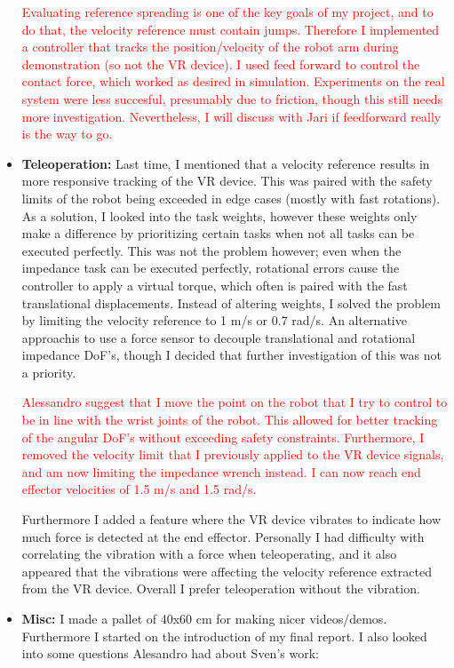 \documentclass[11pt]{report}
\numberwithin{equation}{section}        %
\numberwithin{figure}{section}          %
\numberwithin{table}{section}           %
\begin{document}
\begin{itemize}
   \textcolor{red}{Evaluating reference spreading is one of the key goals of my project, and to do that, the velocity reference must contain jumps. Therefore I implemented a controller that tracks the position/velocity of the robot arm during demonstration (so not the VR device). I used feed forward to control the contact force, which worked as desired in simulation. Experiments on the real system were less succesful, presumably due to friction, though this still needs more investigation. Nevertheless, I will discuss with Jari if feedforward really is the way to go.  }

  \item \textbf{Teleoperation:} Last time, I mentioned that a velocity reference results in more responsive tracking of the VR device. This was paired with the safety limits of the robot being exceeded in edge cases (mostly with fast rotations). As a solution, I looked into the task weights, however these weights only make a difference by prioritizing certain tasks when not all tasks can be executed perfectly. This was not the problem however; even when the impedance task can be executed perfectly, rotational errors cause the controller to apply a virtual torque, which often is paired with the fast translational displacements. Instead of altering weights, I solved the problem by limiting the velocity reference to 1 m/s or 0.7 rad/s. An alternative approachis to use a force sensor to decouple translational and rotational impedance DoF's, though I decided that further investigation of this was not a priority.

   \textcolor{red}{Alessandro suggest that I move the point on the robot that I try to control to be in line with the wrist joints of the robot. This allowed for better tracking of the angular DoF's without exceeding safety constraints. Furthermore, I removed the velocity limit that I previously applied to the VR device signals, and am now limiting the impedance wrench instead. I can now reach end effector velocities of 1.5 m/s and 1.5 rad/s.}

  Furthermore I added a feature where the VR device vibrates to indicate how much force is detected at the end effector. Personally I had difficulty with correlating the vibration with a force when teleoperating, and it also appeared that the vibrations were affecting the velocity reference extracted from the VR device. Overall I prefer teleoperation without the vibration.
    \color{red}
  \item  \textbf{Misc:}  I made a pallet of 40x60 cm for making nicer videos/demos. Furthermore I started on the introduction of my final report. I also looked into some questions Alesandro had about Sven's work:


\end{itemize}
\end{document}
